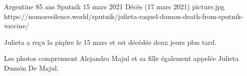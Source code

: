 {Argentine}
{85 ans}
{Sputnik}
{15 mars 2021}
{Décès (17 mars 2021)}
{picture.jpg}
{https://nomoresilence.world/sputnik/julieta-raquel-dumon-death-from-sputnik-vaccine/}
{
  
Julieta a reçu la piqûre le 15 mars et est décédée deux jours plus tard.

Les photos comprennent Alejandro Majul et sa fille également appelée Julieta
Dumón De Majul.

}
